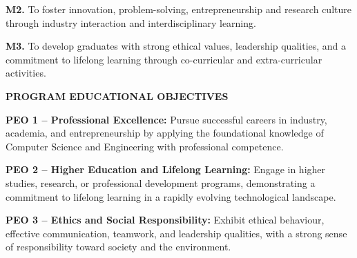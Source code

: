 \begin{center}
\begin{minipage}{0.92\textwidth}
\textbf{M2.}
To foster innovation, problem-solving, entrepreneurship and research
culture through industry interaction and interdisciplinary learning.

\vspace{0.12cm}

\textbf{M3.}
To develop graduates with strong ethical values, leadership qualities,
and a commitment to lifelong learning through co-curricular and
extra-curricular activities.

\vspace{0.3cm}

\begin{center}
{\large\bfseries\textcolor{cyan!70!blue}{PROGRAM EDUCATIONAL OBJECTIVES}}
\end{center}

\textbf{PEO 1 -- Professional Excellence:}
Pursue successful careers in industry, academia, and entrepreneurship
by applying the foundational knowledge of Computer Science and
Engineering with professional competence.

\vspace{0.12cm}

\textbf{PEO 2 -- Higher Education and Lifelong Learning:}
Engage in higher studies, research, or professional development
programs, demonstrating a commitment to lifelong learning in a
rapidly evolving technological landscape.

\vspace{0.12cm}

\textbf{PEO 3 -- Ethics and Social Responsibility:}
Exhibit ethical behaviour, effective communication, teamwork, and
leadership qualities, with a strong sense of responsibility toward
society and the environment.

\vspace{0.25cm}



\end{minipage}

\end{center}






\thispagestyle{empty}

